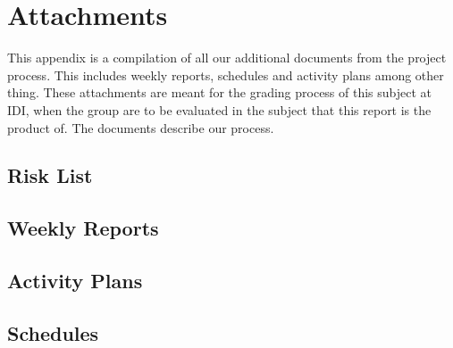 \section{Attachments}\label{Attachments} 
    This appendix is a compilation of all our additional documents from the project process. This includes weekly reports, schedules and activity plans among other thing. These attachments are meant for the grading process of this subject at IDI, when the group are to be evaluated in the subject that this report is the product of. The documents describe our process. 

    \subsection{Risk List}
    \label{Attachments:Risk List}
    
    
    \subsection{Weekly Reports}
    \label{Attachments:Weekly Reports}
    
    
    \subsection{Activity Plans}\label{Attachments:Activity Plans}
    
    
    \subsection{Schedules}\label{Attachments:Schedules}
    
         

